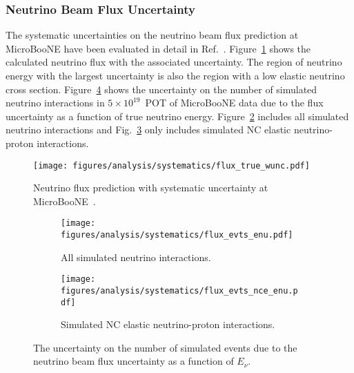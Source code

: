   \subsubsection{Neutrino Beam Flux Uncertainty}\label{sec:fluxuncertainty}
    The systematic uncertainties on the neutrino beam flux prediction at
    MicroBooNE have been evaluated in detail in Ref.~\cite{uBFluxNote}.
    Figure~\ref{fig:ubflux} shows the calculated neutrino flux with the
    associated uncertainty. The region of neutrino energy with the largest
    uncertainty is also the region with a low elastic neutrino cross section.
    Figure~\ref{fig:fluxenu} shows the uncertainty on the number of simulated
    neutrino interactions in $5\times 10^{19}$~POT of MicroBooNE data due to
    the flux uncertainty as a function of true neutrino energy.
    Figure~\ref{fig:fluxenuall} includes all simulated neutrino interactions
    and Fig.~\ref{fig:fluxenunce} only includes simulated NC elastic
    neutrino-proton interactions.
    \begin{figure}[ht]
      \centering
      \texttt{[image: figures/analysis/systematics/flux\_true\_wunc.pdf]}
      \caption{Neutrino flux prediction with systematic uncertainty at
      MicroBooNE~\cite{uBFluxNote}.}
      \label{fig:ubflux}
    \end{figure}
    \begin{figure}[h]
      \centering
      \begin{subfigure}[t]{2.8in}
        \texttt{[image: figures/analysis/systematics/flux\_evts\_enu.pdf]}
        \caption{All simulated neutrino interactions.}
        \label{fig:fluxenuall}
      \end{subfigure}
      \hspace{2pt}
      \begin{subfigure}[t]{2.8in}
        \texttt{[image: figures/analysis/systematics/flux\_evts\_nce\_enu.pdf]}
        \caption{Simulated NC elastic neutrino-proton interactions.}
        \label{fig:fluxenunce}
      \end{subfigure}
      \caption{The uncertainty on the number of simulated events due to the
      neutrino beam flux uncertainty as a function of $E_{\nu}$.}
      \label{fig:fluxenu}
    \end{figure}

